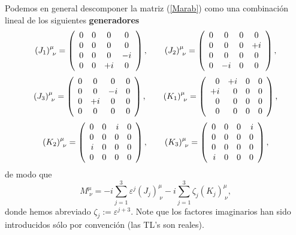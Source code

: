 Podemos en general descomponer la matriz (\ref{Marab}) como una combinación
lineal de los siguientes \textbf{generadores}
\begin{equation}
\left(J_1\right)^\mu_{\ \nu}     =\left(
\begin{array}
[c]{cccc}
0 & 0 & 0 & 0\\
0 & 0 & 0 & 0\\
0 & 0 & 0 & -i\\
0 & 0 & +i & 0
\end{array}
\right), \qquad
\left(J_2\right)^\mu_{\ \nu}=\left(\begin{array}
[c]{cccc}
0 & 0 & 0 & 0\\
0 & 0 & 0 & +i\\
0 & 0 & 0 & 0\\
0 & -i & 0 & 0
\end{array}
\right),
\end{equation}
\begin{equation}
\left(J_3\right)^\mu_{\ \nu}=\left(
\begin{array}
[c]{cccc}
0 & 0 & 0 & 0\\
0 & 0 & -i & 0\\
0 & +i & 0 & 0\\
0 & 0 & 0 & 0
\end{array}
\right), \qquad
\left(K_1\right)^\mu_{\ \nu} =\left(
\begin{array}
[c]{rrrr}
0 & +i & 0 & 0\\
+i & 0 & 0 & 0\\
0 & 0 & 0 & 0\\
0 & 0 & 0 & 0
\end{array}
\right) ,
\end{equation}
\begin{equation}
\left(K_2\right)^\mu_{\ \nu}=\left(
\begin{array}
[c]{rrrr}
0 & 0 & i & 0\\
0 & 0 & 0 & 0\\
i & 0 & 0 & 0\\
0 & 0 & 0 & 0
\end{array}
\right), \qquad
\left(K_3\right)^\mu_{\ \nu}=\left(
\begin{array}
[c]{rrrr}
0 & 0 & 0 & i\\
0 & 0 & 0 & 0\\
0 & 0 & 0 & 0\\
i & 0 & 0 & 0
\end{array}
\right),
\end{equation}
de modo que
\begin{equation}
M^\mu_{\ \nu}= -i\sum_{j=1}^3\varepsilon^j\left(J_j\right)^\mu_{\
\nu}-i\sum_{j=1}^3\zeta_j\left(K_j\right)^\mu_{\ \nu}, \label{M}
\end{equation}
donde hemos abreviado $\zeta_j:=\varepsilon^{j+3}$. Note que los factores
imaginarios han sido introducidos sólo por convención (las TL's son reales).


